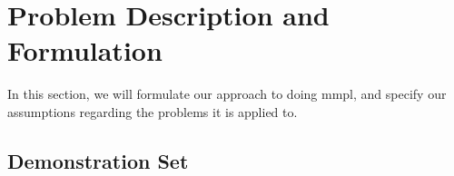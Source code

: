 \section{Problem Description and Formulation}
\label{sec:formulation}
%

In this section, we will formulate our approach to doing {\sc mmpl}, and
specify our assumptions regarding the problems it is applied to.







 
\subsection{Demonstration Set}

